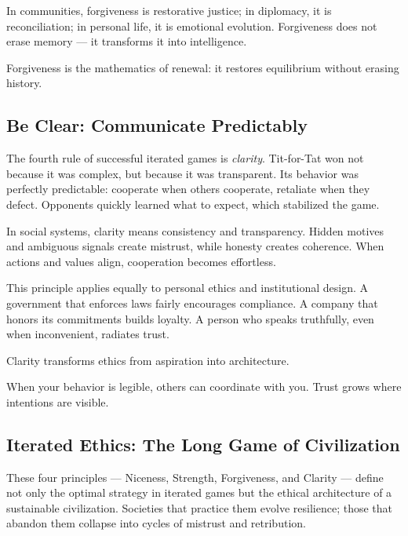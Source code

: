 \documentclass[12pt,twoside]{book}
\begin{document}
In communities, forgiveness is restorative justice; in diplomacy, it is reconciliation; in personal life, it is emotional evolution.  
Forgiveness does not erase memory --- it transforms it into intelligence.\\

\begin{keyidea}
Forgiveness is the mathematics of renewal: it restores equilibrium without erasing history.
\end{keyidea}

\subsection*{Be Clear: Communicate Predictably}

The fourth rule of successful iterated games is \emph{clarity}.  
Tit-for-Tat won not because it was complex, but because it was transparent.  
Its behavior was perfectly predictable: cooperate when others cooperate, retaliate when they defect.  
Opponents quickly learned what to expect, which stabilized the game.  

In social systems, clarity means consistency and transparency.  
Hidden motives and ambiguous signals create mistrust, while honesty creates coherence.  
When actions and values align, cooperation becomes effortless.  

This principle applies equally to personal ethics and institutional design.  
A government that enforces laws fairly encourages compliance.  
A company that honors its commitments builds loyalty.  
A person who speaks truthfully, even when inconvenient, radiates trust.  

Clarity transforms ethics from aspiration into architecture.\\

\begin{keyidea}
When your behavior is legible, others can coordinate with you.  
Trust grows where intentions are visible.
\end{keyidea}

\subsection*{Iterated Ethics: The Long Game of Civilization}

These four principles --- Niceness, Strength, Forgiveness, and Clarity --- define not only the optimal strategy in iterated games but the ethical architecture of a sustainable civilization.  
Societies that practice them evolve resilience; those that abandon them collapse into cycles of mistrust and retribution.  
\end{document}

